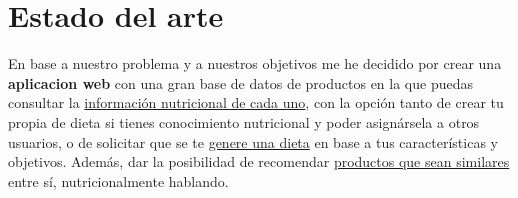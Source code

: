 \section{Estado del arte} \label{sec:estado_del_arte}

En base a nuestro problema y a nuestros objetivos me he decidido por crear una \textbf{aplicacion web} con una gran base de datos de productos en la que puedas consultar
la \href{https://github.com/josemip98/TFG/issues/3}{información nutricional de cada uno}, con la opción tanto de crear tu propia de dieta si tienes conocimiento nutricional y poder asignársela a otros usuarios, o de solicitar que 
se te \href{https://github.com/josemip98/TFG/issues/12}{genere una dieta} en base a tus características y objetivos. Además, dar la posibilidad de recomendar \href{https://github.com/josemip98/TFG/issues/10}{productos que sean similares} entre sí, nutricionalmente hablando.

